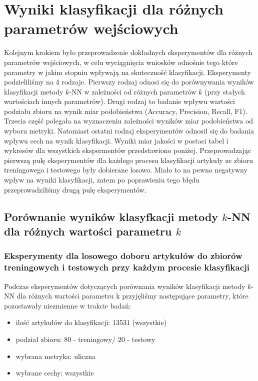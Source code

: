 \documentclass{classrep}
\begin{document}
\section{Wyniki klasyfikacji dla różnych parametrów wejściowych}
Kolejnym krokiem było przeprowadzenie dokładnych eksperymentów dla różnych parametrów wejściowych, w celu wyciągnięcia wniosków odnośnie tego które parametry w jakim stopniu wpływają na skuteczność klasyfikacji. Eksperymenty podzieliliśmy na 4 rodzaje. Pierwszy rodzaj odnosi się do porównywania wyników klasyfikacji metody $k$-NN w zależności od różnych parametrów $k$ (przy stałych wartościach innych parametrów). Drugi rodzaj to badanie wpływu wartości podziału zbioru na wynik miar podobieństwa (Accuracy, Precision, Recall, F1). Trzecia część polegała na wyznaczeniu zależności wyników miar podobieństwa od wyboru metryki. Natomiast ostatni rodzaj eksperymentów odnosił się do badania wpływu cech na wynik klasyfikacji. Wyniki miar jakości w postaci tabel i wykresów dla wszystkich ekspermentów przedstawiono poniżej. Przeprowadzając pierwszą pulę eksperymentów dla każdego procesu klasyfikacji artykuły ze zbioru treningowego i testowego były dobierane losowo. Miało to na pewno negatywny wpływ na wyniki klasyfikacji, zatem po poprawieniu tego błędu przeprowadziliśmy drugą pulę eksperymentów.

\subsection{Porównanie wyników klasyfkacji metody $k$-NN dla różnych wartości parametru $k$}
\subsubsection{Eksperymenty dla losowego doboru artykułów do zbiorów treningowych i testowych przy każdym procesie klasyfikacji}

Podczas eksperymentów dotyczących porównania wyników klasyfikacji metody $k$-NN dla różnych wartości parametru k przyjęliśmy następujące parametry, które pozostawały niezmienne w trakcie badań:
\begin{itemize}
    \item ilość artykułów do klasyfikacji: 13531 (wszystkie)
    \item podział zbioru: 80 - treningowy/ 20 - testowy
    \item wybrana metryka: uliczna
    \item wybrane cechy: wszystkie
\end{itemize}
\end{document}
